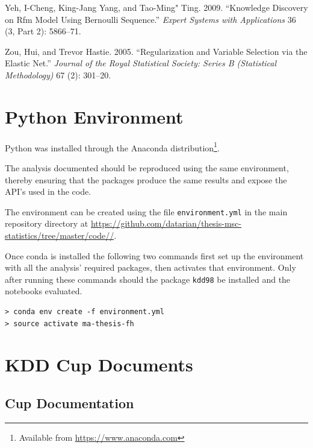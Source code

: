 \documentclass[
  11pt,
  a4paper,
  DIV=12,captions=tableheading,oneside,titlepage]{scrbook}
\begin{document}
\leavevmode\hypertarget{ref-yeh2009}{}%
Yeh, I-Cheng, King-Jang Yang, and Tao-Ming" Ting. 2009. ``Knowledge Discovery on Rfm Model Using Bernoulli Sequence.'' \emph{Expert Systems with Applications} 36 (3, Part 2): 5866--71.

\leavevmode\hypertarget{ref-zou2005regularization}{}%
Zou, Hui, and Trevor Hastie. 2005. ``Regularization and Variable Selection via the Elastic Net.'' \emph{Journal of the Royal Statistical Society: Series B (Statistical Methodology)} 67 (2): 301--20.

\hypertarget{appendix-appendix}{%
\appendix}


\hypertarget{python-environment}{%
\chapter{Python Environment}\label{python-environment}}

Python was installed through the Anaconda distribution\footnote{Available from \url{https://www.anaconda.com}}.

The analysis documented should be reproduced using the same environment, thereby ensuring that the packages produce the same results and expose the API's used in the code.

The environment can be created using the file \texttt{environment.yml} in the main repository directory at \url{https://github.com/datarian/thesis-msc-statistics/tree/master/code//}.

Once conda is installed the following two commands first set up the environment with all the analysis' required packages, then activates that environment. Only after running these commands should the package \texttt{kdd98} be installed and the notebooks evaluated.

\begin{verbatim}
> conda env create -f environment.yml
> source activate ma-thesis-fh
\end{verbatim}

\hypertarget{kdd-cup-documents}{%
\chapter{KDD Cup Documents}\label{kdd-cup-documents}}

\hypertarget{data-set-documentation}{%
\section{Cup Documentation}\label{data-set-documentation}}
\end{document}
